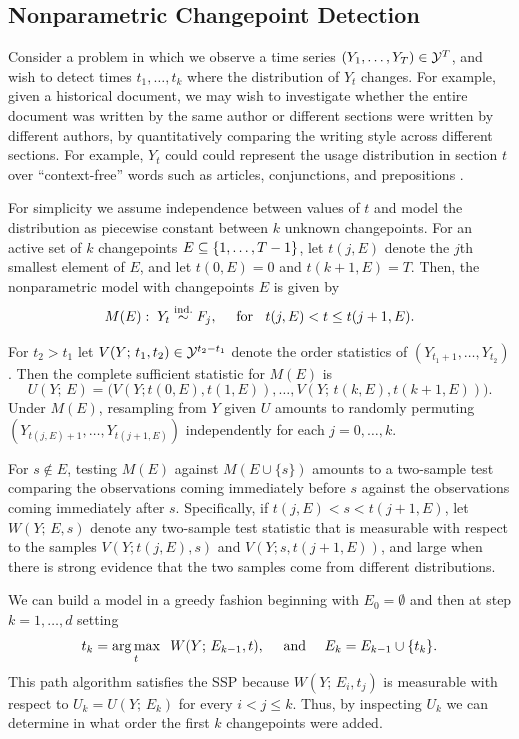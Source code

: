 \documentclass{article}
\begin{document}
\subsection{Nonparametric Changepoint Detection}

Consider a problem in which we observe a time series $(Y_1,\ldots,Y_T)\in \mathcal{Y}^T$, and wish to detect times $t_1,\ldots,t_k$ where the distribution of $Y_t$ changes. For example, given a historical document, we may wish to investigate whether the entire document was written by the same author or different sections were written by different authors, by quantitatively comparing the writing style across different sections. For example, $Y_t$ could could represent the usage distribution in section $t$ over ``context-free'' words such as articles, conjunctions, and prepositions \citep[][see e.g. ]{chen2015graph}.

For simplicity we assume independence between values of $t$ and model the distribution as piecewise constant between $k$ unknown changepoints. For an active set of $k$ changepoints $E\subseteq \{1,\ldots, T-1\}$, let $t(j,E)$ denote the $j$th smallest element of $E$, and let $t(0,E)=0$ and $t(k+1, E)=T$. Then, the nonparametric model with changepoints $E$ is given by
\begin{equation}\label{eq:nonpar-model}
  M(E):\; Y_t \overset{\textrm{ind.}}{\sim} F_j, \quad \text{ for } \;\;t(j,E) < t \leq t(j+1,E).
\end{equation}

For $t_2>t_1$ let $V(Y;\, t_1, t_2)\in \mathcal{Y}^{t_2-t_1}$ denote the order statistics of $(Y_{t_1+1},\ldots, Y_{t_2})$. Then the complete sufficient statistic for $M(E)$ is
\[
U(Y; \, E) = 
\bigg(
V(Y; t(0, E), t(1, E)), \ldots, V(Y;\, t(k, E), t(k+1,E))
\bigg).
\]
Under $M(E)$, resampling from $Y$ given $U$ amounts to randomly permuting $(Y_{t(j,E)+1}, \ldots, Y_{t(j+1,E)})$ independently for each $j=0,\ldots,k$.

For $s \notin E$, testing $M(E)$ against $M(E \cup \{s\})$ amounts to a two-sample test comparing the observations coming immediately before $s$ against the observations coming immediately after $s$. Specifically, if $t(j, E) < s < t(j+1, E)$, let $W(Y; \, E, s)$ denote any two-sample test statistic that is measurable with respect to the samples $V(Y; t(j, E), s)$ and $V(Y; s, t(j+1, E))$, and large when there is strong evidence that the two samples come from different distributions. 

We can build a model in a greedy fashion beginning with $E_0 = \emptyset$ and then at step $k=1,\ldots,d$ setting
\begin{equation}
  t_k = \operatorname*{arg\,max}_t \;\; W(Y; \, E_{k-1}, t), 
  \quad \text{ and } \quad E_k = E_{k-1} \cup \{t_k\}.
\end{equation}
This path algorithm satisfies the SSP because $W(Y; \, E_{i}, t_j)$ is measurable with respect to $U_k=U(Y; \, E_k)$ for every $i<j\leq k$. Thus, by inspecting $U_k$ we can determine in what order the first $k$ changepoints were added.
\end{document}
